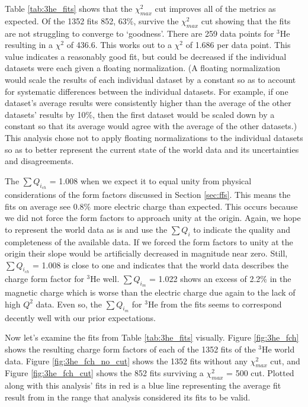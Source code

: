 Table \ref{tab:3he_fits} shows that the $\chi^2_{max}$ cut improves all of the metrics as expected. Of the 1352 fits 852, 63$\%$, survive the $\chi^2_{max}$ cut showing that the fits are not struggling to converge to `goodness'. There are 259 data points for $^3$He resulting in a $\chi^2$ of 436.6. This works out to a $\chi^2$ of 1.686 per data point. This value indicates a reasonably good fit, but could be decreased if the individual datasets were each given a floating normalization. (A floating normalization would scale the results of each individual dataset by a constant so as to account for systematic differences between the individual datasets. For example, if one dataset's average results were consistently higher than the average of the other datasets' results by 10$\%$, then the first dataset would be scaled down by a constant so that its average would agree with the average of the other datasets.) This analysis chose not to apply floating normalizations to the individual datasets so as to better represent the current state of the world data and its uncertainties and disagreements.%

The $\sum Q_{i_{ch}}$ = 1.008 when we expect it to equal unity from physical considerations of the form factors discussed in Section \ref{sec:ffs}. This means the fits on average see 0.8$\%$ more electric charge than expected. This occurs because we did not force the form factors to approach unity at the origin. Again, we hope to represent the world data as is and use the $\sum Q_{i}$ to indicate the quality and completeness of the available data. If we forced the form factors to unity at the origin their slope would be artificially decreased in magnitude near zero. Still, $\sum Q_{i_{ch}}$ = 1.008 is close to one and indicates that the world data describes the charge form factor for $^3$He well. $\sum Q_{i_{m}}$ = 1.022 shows an excess of 2.2$\%$ in the magnetic charge which is worse than the electric charge due again to the lack of high $Q^2$ data. Even so, the $\sum Q_{i_{m}}$ for $^3$He from the fits seems to correspond decently well with our prior expectations. %

Now let's examine the fits from Table \ref{tab:3he_fits} visually. Figure \ref{fig:3he_fch} shows the resulting charge form factors of each of the 1352 fits of the $^3$He world data. Figure \ref{fig:3he_fch_no_cut} shows the 1352 fits without any $\chi^2_{max}$ cut, and Figure \ref{fig:3he_fch_cut} shows the 852 fits surviving a $\chi^2_{max}$ = 500 cut. Plotted along with this analysis' fits in red is a blue line representing the average fit result from \cite{Article:Amroun} in the range that analysis considered its fits to be valid. 

